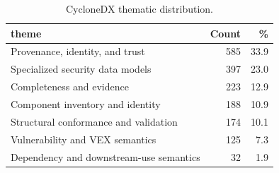 \begin{table}[t]
\caption{CycloneDX thematic distribution.}
\label{tab:cdx-theme-distribution}
\centering
\small
\begin{tabularx}{\columnwidth}{@{}Xrr@{}}
\toprule
\textbf{theme} & \textbf{Count} & \textbf{\%} \\
\midrule
Provenance, identity, and trust & 585 & 33.9 \\
Specialized security data models & 397 & 23.0 \\
Completeness and evidence & 223 & 12.9 \\
Component inventory and identity & 188 & 10.9 \\
Structural conformance and validation & 174 & 10.1 \\
Vulnerability and VEX semantics & 125 & 7.3 \\
Dependency and downstream-use semantics & 32 & 1.9 \\
\bottomrule
\end{tabularx}
\end{table}
